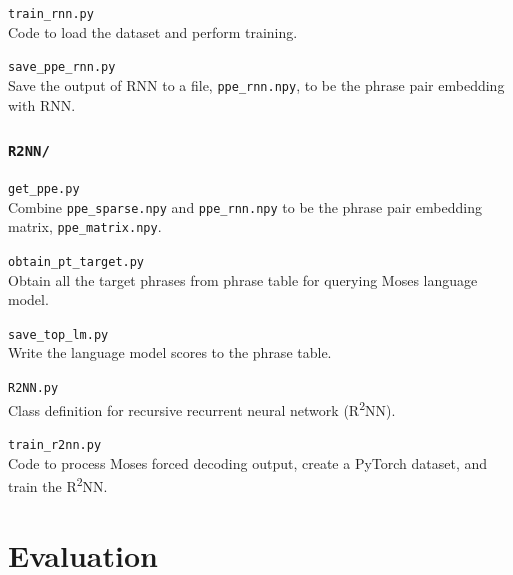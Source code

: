 \documentclass[12pt,a4paper,twoside,openright]{report}
\begin{document}
\texttt{train\_rnn.py}\\
Code to load the dataset and perform training.

\texttt{save\_ppe\_rnn.py}\\
Save the output of RNN to a file, \texttt{ppe\_rnn.npy}, to be the phrase pair embedding with RNN.

\subsection{\texttt{R2NN/}}
\texttt{get\_ppe.py}\\
Combine \texttt{ppe\_sparse.npy} and \texttt{ppe\_rnn.npy} to be the phrase pair embedding matrix, \texttt{ppe\_matrix.npy}.

\texttt{obtain\_pt\_target.py}\\
Obtain all the target phrases from phrase table for querying Moses language model.

\texttt{save\_top\_lm.py}\\
Write the language model scores to the phrase table.

\texttt{R2NN.py}\\
Class definition for recursive recurrent neural network (R\textsuperscript{2}NN).

\texttt{train\_r2nn.py}\\
Code to process Moses forced decoding output, create a PyTorch dataset, and train the R\textsuperscript{2}NN.


\chapter{Evaluation}\label{chapter:evaluation}
\end{document}
